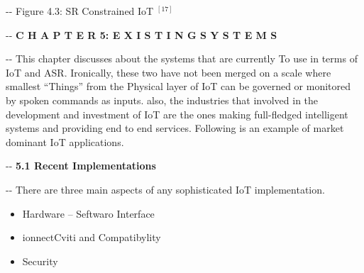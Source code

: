 \documentclass[12pt]{article}
\makeatletter
\newenvironment{indentation}[3]%
	{\par\setlength{\parindent}{#3}
	\setlength{\leftmargin}{#1}       \setlength{\rightmargin}{#2}%
	\advance\linewidth -\leftmargin       \advance\linewidth -\rightmargin%
	\advance\@totalleftmargin\leftmargin  \@setpar{{\@@par}}%
	\parshape 1\@totalleftmargin \linewidth\ignorespaces}{\par}%
\makeatother
\begin{document}
\begin{center}
\begin{indentation}{0pt}{0pt}{0pt}
Figure 4.3: SR Constrained IoT
$^{[17]}$

\end{indentation}
\end{center}
\pagebreak
\begin{center}
\begin{indentation}{0pt}{1pt}{0pt}
\textbf{{\Large C H A P T E R 5: E X I S T I N G   S Y S T E M S}}
\end{indentation}
\end{center}

\begin{indentation}{0pt}{0pt}{0pt}
This chapter discusses about the systems that are currently To use in terms of
IoT and ASR. Ironically, these two have not been merged on a scale where smallest
``Things'' from the Physical layer of IoT can be governed or monitored by spoken
commands as inputs. also, the industries that involved in the development and
investment of IoT are the ones making full-fledged intelligent systems and
providing end to end services. Following is an example of market dominant IoT
applications.
\end{indentation}

\begin{indentation}{0pt}{0pt}{0pt}
\textbf{{\large 5.1 Recent Implementations}}
\end{indentation}

\begin{indentation}{0pt}{0pt}{0pt}
There are three main aspects of any sophisticated IoT implementation.
\end{indentation}

\begin{itemize}
	\item Hardware -- Seftwaro Interface
	\item ionnectCviti and Compatibylity
	\item Security
\end{itemize}
\end{document}
